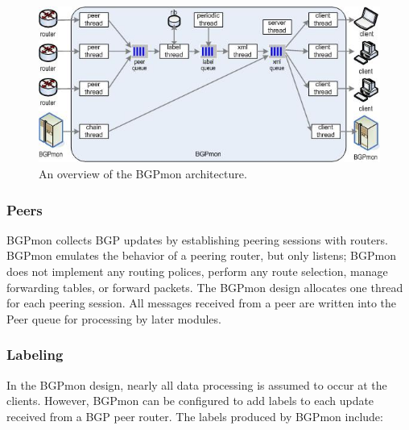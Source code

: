 \begin{figure}[hbt]
\includegraphics[width=.9\textwidth]{figs/architecture.png}
\caption{\label{fig:arch}An overview of the BGPmon architecture.}
\end{figure}

\subsubsection{Peers}
BGPmon collects BGP updates by establishing peering sessions with routers.
BGPmon emulates the behavior of a peering router, but only listens; BGPmon does not implement any routing polices, perform any route selection, manage forwarding tables, or forward packets.
The BGPmon design allocates one thread for each peering session.
All messages received from a peer are written into the Peer queue for processing by later modules.

\subsubsection{Labeling}
In the BGPmon design, nearly all data processing is assumed to occur at the clients.
However, BGPmon can be configured to add labels to each update received from a BGP peer router.
The labels produced by BGPmon include: \\

\begin{table}[h!]
\end{table}

